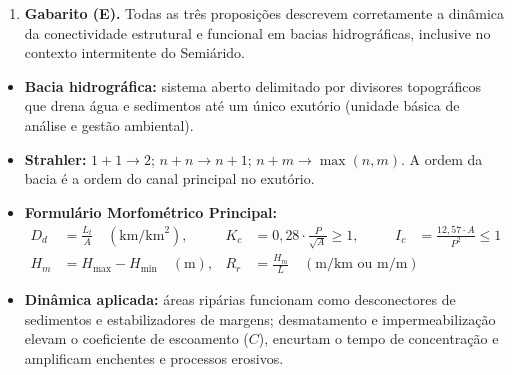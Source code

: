 \begin{boxGabarito}
\begin{enumerate}[leftmargin=1.8em, itemsep=3.5pt]
  \item \textbf{Gabarito (E).} Todas as três proposições descrevem corretamente a dinâmica da conectividade estrutural e funcional em bacias hidrográficas, inclusive no contexto intermitente do Semiárido.
\end{enumerate}
\end{boxGabarito}

\begin{boxResumo}
\begin{itemize}[leftmargin=1.4em, itemsep=2.5pt]
  \item \textbf{Bacia hidrográfica:} sistema aberto delimitado por divisores topográficos que drena água e sedimentos até um único exutório (unidade básica de análise e gestão ambiental).
  \item \textbf{Strahler:} $1 + 1 \to 2$; $n + n \to n + 1$; $n + m \to \max(n, m)$. A ordem da bacia é a ordem do canal principal no exutório.
  \item \textbf{Formulário Morfométrico Principal:}
  \begin{align*}
    D_d &= \frac{L_t}{A} \quad (\text{km}/\text{km}^2), & K_c &= 0{,}28 \cdot \frac{P}{\sqrt{A}} \ge 1, & I_c &= \frac{12{,}57 \cdot A}{P^2} \le 1 \\
    H_m &= H_{\max} - H_{\min} \quad (\text{m}), & R_r &= \frac{H_m}{L} \quad (\text{m}/\text{km ou m}/\text{m}) & &
  \end{align*}
  \item \textbf{Dinâmica aplicada:} áreas ripárias funcionam como desconectores de sedimentos e estabilizadores de margens; desmatamento e impermeabilização elevam o coeficiente de escoamento ($C$), encurtam o tempo de concentração e amplificam enchentes e processos erosivos.
\end{itemize}
\end{boxResumo}

